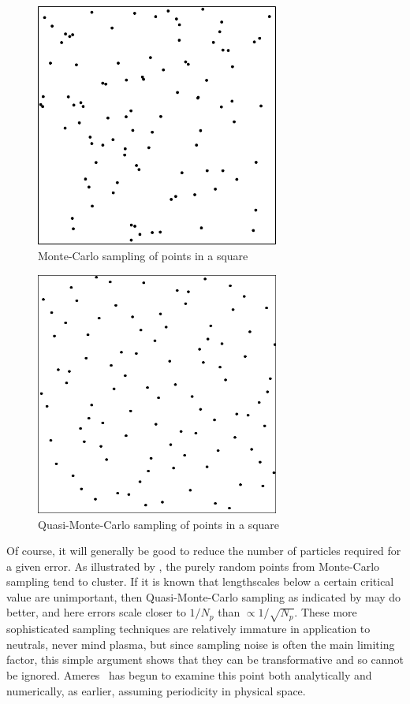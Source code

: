 \begin{figure}
\centerline{\includegraphics[width=8cm]{../png/ranlux1}}
\caption{Monte-Carlo sampling of points in a square\label{fig:ranlux1}}
\end{figure}
\begin{figure}
\centerline{\includegraphics[width=8cm]{../png/halton1}}
\caption{Quasi-Monte-Carlo sampling of points in a square\label{fig:halton1}}
\end{figure}

Of course,
it will generally be good to reduce the number of particles required for a given error.
As illustrated by , the purely random points from Monte-Carlo sampling
tend to cluster. If it is known that lengthscales below a certain critical value are
unimportant, then Quasi-Monte-Carlo sampling as indicated by  may do better, and here
errors scale closer to $1/N_p$ than $\propto 1/\sqrt{N_p}$. 
These more sophisticated sampling techniques are relatively immature in application to neutrals,
never mind plasma, but since sampling noise is often the main limiting factor, this simple
argument shows that they can be transformative and so cannot be ignored. Ameres~\cite{ameres}
has begun to examine this point both analytically and numerically, as earlier, assuming
periodicity in physical space.

